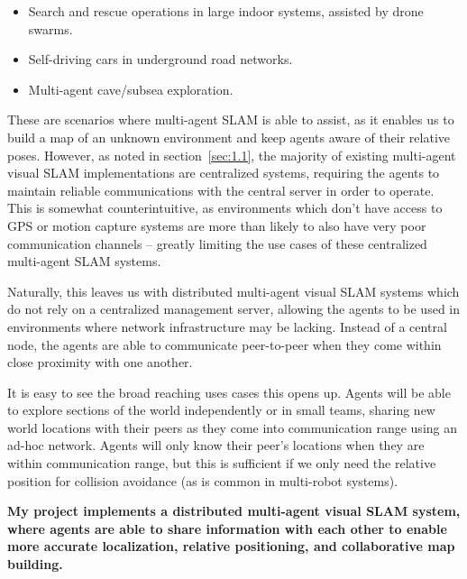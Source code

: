 {
    \begin{itemize}[nosep]
        \item Search and rescue operations in large indoor systems, assisted by drone swarms.
        \item Self-driving cars in underground road networks.
        \item Multi-agent cave/subsea exploration.
    \end{itemize}
}

These are scenarios where multi-agent SLAM is able to assist, as it enables us to build a map of an unknown environment and keep agents aware of their relative poses. However, as noted in section~\ref{sec:1.1}, the majority of existing multi-agent visual SLAM implementations are centralized systems, requiring the agents to maintain reliable communications with the central server in order to operate. This is somewhat counterintuitive, as environments which don't have access to GPS or motion capture systems are more than likely to also have very poor communication channels -- greatly limiting the use cases of these centralized multi-agent SLAM systems.

Naturally, this leaves us with distributed multi-agent visual SLAM systems which do not rely on a centralized management server, allowing the agents to be used in environments where network infrastructure may be lacking. Instead of a central node, the agents are able to communicate peer-to-peer when they come within close proximity with one another.

It is easy to see the broad reaching uses cases this opens up. Agents will be able to explore sections of the world independently or in small teams, sharing new world locations with their peers as they come into communication range using an ad-hoc network. Agents will only know their peer's locations when they are within communication range, but this is sufficient if we only need the relative position for collision avoidance (as is common in multi-robot systems).

\textbf{My project implements a distributed multi-agent visual SLAM system, where agents are able to share information with each other to enable more accurate localization, relative positioning, and collaborative map building.}

